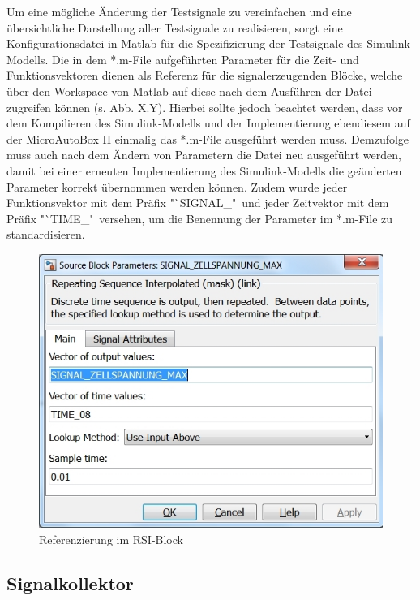 \documentclass[fontsize = 12pt, paper = a4]{scrreprt}
\begin{document}
Um eine mögliche Änderung der Testsignale zu vereinfachen und eine übersichtliche Darstellung aller Testsignale zu realisieren, sorgt eine Konfigurationsdatei in Matlab für die Spezifizierung der Testsignale des Simulink-Modells. Die in dem *.m-File aufgeführten Parameter für die Zeit- und Funktionsvektoren dienen als Referenz für die signalerzeugenden Blöcke, welche über den Workspace von Matlab auf diese nach dem Ausführen der Datei zugreifen können (s. Abb. X.Y). Hierbei sollte jedoch beachtet werden, dass vor dem Kompilieren des Simulink-Modells und der Implementierung ebendiesem auf der MicroAutoBox II einmalig das *.m-File ausgeführt werden muss. Demzufolge muss auch nach dem Ändern von Parametern die Datei neu ausgeführt werden, damit bei einer erneuten Implementierung des Simulink-Modells die geänderten Parameter korrekt übernommen werden können. Zudem wurde jeder Funktionsvektor mit dem Präfix "`SIGNAL\_"\ und jeder Zeitvektor mit dem Präfix "`TIME\_"\ versehen, um die Benennung der Parameter im *.m-File zu standardisieren. \\

\begin{figure}[h]
\centering
\includegraphics[scale = 0.55]{referenz}
\caption{Referenzierung im RSI-Block}
\end{figure}

\newpage


\subsection{Signalkollektor}
\end{document}
